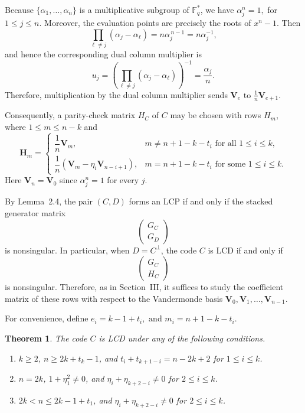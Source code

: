 \documentclass[12pt,draftcls,journal,onecolumn]{IEEEtran}
\newtheorem{theorem}{Theorem}
\newcommand{\F}{{\mathbb{F}}}
\begin{document}
Because
\(\{\alpha_1,\ldots,\alpha_n\}\) is a multiplicative subgroup of
\(\F_q^*\), we have
\(
\alpha_j^n=1,
\)
for \(1\le j\le n\).
Moreover, the evaluation points are precisely the roots of
\(x^n-1\). Then
\[
\prod_{\ell\ne j}(\alpha_j-\alpha_\ell)
=
n\alpha_j^{\,n-1}
=
n\alpha_j^{-1},
\]
and hence the corresponding dual column multiplier is
\[
u_j
=
\left(
\prod_{\ell\ne j}(\alpha_j-\alpha_\ell)
\right)^{-1}
=
\frac{\alpha_j}{n}.
\]
Therefore, multiplication by the dual column multiplier sends
\(
\mathbf{V}_e \text{ to } \frac1n\mathbf{V}_{e+1}.
\)

Consequently, a parity-check matrix \(H_C\) of \(C\) may be chosen
with rows \(H_m\), where \(1\le m\le n-k\) and
\begin{equation}\label{eq:Hm}
\mathbf{H}_m=
\begin{cases}
\dfrac{1}{n}\mathbf{V}_m,
& m\ne n+1-k-t_i \text{ for all } 1\le i\le k,\\[1.2ex]
\dfrac{1}{n}\left(\mathbf{V}_m-\eta_i\mathbf{V}_{n-i+1}\right),
& m=n+1-k-t_i \text{ for some } 1\le i\le k.
\end{cases}
\end{equation}
Here \(\mathbf{V}_n=\mathbf{V}_0\) since \(\alpha_j^n=1\) for every \(j\).

By Lemma~2.4, the pair \((C,D)\) forms an LCP if and only if the stacked
generator matrix
\[
\begin{pmatrix}
G_C\\
G_D
\end{pmatrix}
\]
is nonsingular. In particular, when \(D=C^\perp\), the code \(C\) is
LCD if and only if
\[
\begin{pmatrix}
G_C\\
H_C
\end{pmatrix}
\]
is nonsingular. Therefore, as in Section~III, it suffices to study the
coefficient matrix of these rows with respect to the Vandermonde basis
\(
\mathbf{V}_0,\mathbf{V}_1,\ldots,\mathbf{V}_{n-1}.
\)

For convenience, define
\(
e_i=k-1+t_i, \text{ and }
m_i=n+1-k-t_i.
\)

\begin{theorem}\label{thm:LCD}
The code $C$ is LCD under any of the following conditions.
\begin{enumerate}
\item[(i)] $k\ge2$, $n\ge2k+t_k-1$, and
$t_i+t_{k+1-i}=n-2k+2$ for $1\le i\le k$.

\item[(ii)] $n=2k$, $1+\eta_1^2\ne0$, and
$\eta_i+\eta_{k+2-i}\ne0$ for $2\le i\le k$.

\item[(iii)] $2k<n\le2k-1+t_1$, and
$\eta_i+\eta_{k+2-i}\ne0$ for $2\le i\le k$.
\end{enumerate}
\end{theorem}
\end{document}
